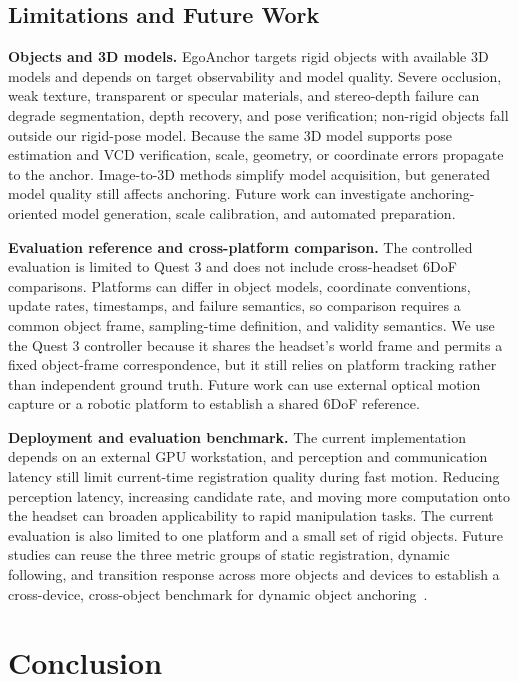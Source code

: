 \documentclass[review]{vgtc}
\begin{document}
\subsection{Limitations and Future Work}

\textbf{Objects and 3D models.}
EgoAnchor targets rigid objects with available 3D models and depends on target observability and model quality. Severe occlusion, weak texture, transparent or specular materials, and stereo-depth failure can degrade segmentation, depth recovery, and pose verification; non-rigid objects fall outside our rigid-pose model. Because the same 3D model supports pose estimation and VCD verification, scale, geometry, or coordinate errors propagate to the anchor. Image-to-3D methods simplify model acquisition, but generated model quality still affects anchoring. Future work can investigate anchoring-oriented model generation, scale calibration, and automated preparation.

\textbf{Evaluation reference and cross-platform comparison.}
The controlled evaluation is limited to Quest 3 and does not include cross-headset 6DoF comparisons. Platforms can differ in object models, coordinate conventions, update rates, timestamps, and failure semantics, so comparison requires a common object frame, sampling-time definition, and validity semantics. We use the Quest 3 controller because it shares the headset's world frame and permits a fixed object-frame correspondence, but it still relies on platform tracking rather than independent ground truth. Future work can use external optical motion capture or a robotic platform to establish a shared 6DoF reference.

\textbf{Deployment and evaluation benchmark.}
The current implementation depends on an external GPU workstation, and perception and communication latency still limit current-time registration quality during fast motion. Reducing perception latency, increasing candidate rate, and moving more computation onto the headset can broaden applicability to rapid manipulation tasks. The current evaluation is also limited to one platform and a small set of rigid objects. Future studies can reuse the three metric groups of static registration, dynamic following, and transition response across more objects and devices to establish a cross-device, cross-object benchmark for dynamic object anchoring~\cite{cheng2024tracking,hu2024applemeta,hu2025xrrealitycheck}.

\section{Conclusion}\label{sec:conclusion}
\end{document}
